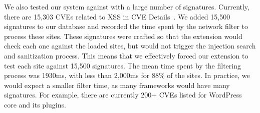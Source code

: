 We also tested our system against with a large number of signatures. Currently,
there are 15,303 CVEs related to XSS in CVE Details~\cite{xsscves}. We added
15,500 signatures to our database and recorded the time spent by the 
network filter to process these sites. These signatures were crafted so that
the extension would check each one against the loaded sites,
but would not trigger the injection search and sanitization process.
This means that we effectively forced 
our extension to test each site against 15,500 signatures. The mean time spent 
by the filtering process was 1930ms, with less than 2,000ms for 88\% 
of the sites. In practice, we would expect a smaller filter time, as many 
frameworks would have many signatures. For example, there are 
currently 200+ CVEs listed for WordPress core and its plugins.


